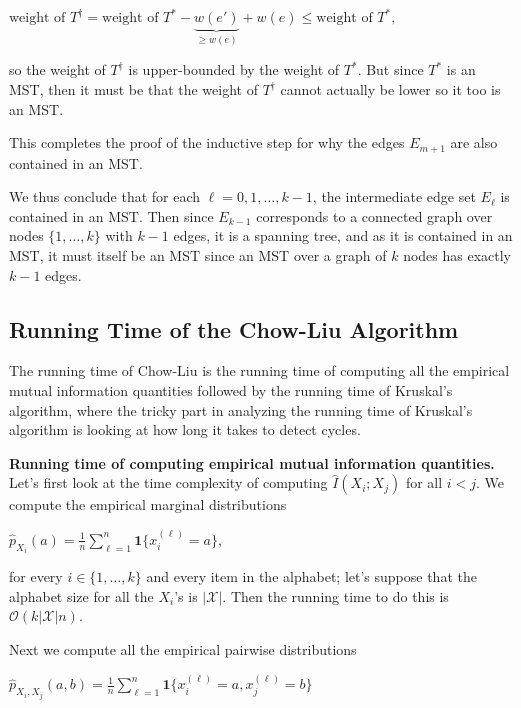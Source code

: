 {\centering$\text {weight of }T^{\dagger }=\text {weight of }T^{*}-\underbrace{w(e')}_{\ge w(e)}+w(e)\le \text {weight of }T^{*},$ \par}
 
so the weight of $T^{\dagger }$ is upper-bounded by the weight of $T^{*}$. But since $T^{*}$ is an MST, then it must be that the weight of $T^{\dagger }$ cannot actually be lower so it too is an MST.

This completes the proof of the inductive step for why the edges $E_{m+1}$ are also contained in an MST.

We thus conclude that for each $\ell =0,1,\dots ,k-1$, the intermediate edge set $E_{\ell }$ is contained in an MST. Then since $E_{k-1}$ corresponds to a connected graph over nodes $\{1,\dots,k\}$ with $k-1$ edges, it is a spanning tree, and as it is contained in an MST, it must itself be an MST since an MST over a graph of $k$ nodes has exactly $k-1$ edges.

\subsection{Running Time of the Chow-Liu Algorithm}

The running time of Chow-Liu is the running time of computing all the empirical mutual information quantities followed by the running time of Kruskal's algorithm, where the tricky part in analyzing the running time of Kruskal's algorithm is looking at how long it takes to detect cycles.

\textbf{Running time of computing empirical mutual information quantities.} Let's first look at the time complexity of computing $\widehat{I}(X_{i};X_{j})$ for all $i<j$. We compute the empirical marginal distributions

{\centering$\widehat{p}_{X_{i}}(a)=\frac{1}{n}\sum _{\ell =1}^{n}\mathbf{1}\{ x_{i}^{(\ell )}=a\} ,$ \par}
 
for every $i\in \{ 1,\dots ,k\}$ and every item in the alphabet; let's suppose that the alphabet size for all the $X_i$'s is $|\mathcal{X}|$. Then the running time to do this is $\mathcal{O}(k|\mathcal{X}|n)$.

Next we compute all the empirical pairwise distributions

{\centering$\widehat{p}_{X_{i},X_{j}}(a,b)=\frac{1}{n}\sum _{\ell =1}^{n}\mathbf{1}\{ x_{i}^{(\ell )}=a,x_{j}^{(\ell )}=b\}$ \par}
 
